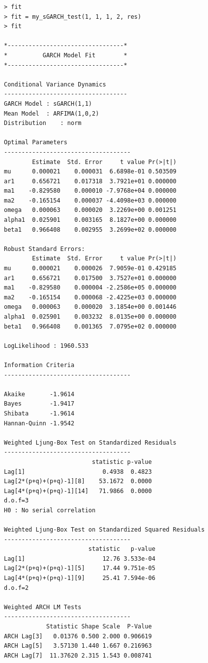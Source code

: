 \documentclass[a4paper, 11pt]{article}
\begin{document}
\begin{verbatim}
> fit
> fit = my_sGARCH_test(1, 1, 1, 2, res)
> fit

*---------------------------------*
*          GARCH Model Fit        *
*---------------------------------*

Conditional Variance Dynamics 	
-----------------------------------
GARCH Model	: sGARCH(1,1)
Mean Model	: ARFIMA(1,0,2)
Distribution	: norm 

Optimal Parameters
------------------------------------
        Estimate  Std. Error     t value Pr(>|t|)
mu      0.000021    0.000031  6.6898e-01 0.503509
ar1     0.656721    0.017318  3.7921e+01 0.000000
ma1    -0.829580    0.000010 -7.9768e+04 0.000000
ma2    -0.165154    0.000037 -4.4098e+03 0.000000
omega   0.000063    0.000020  3.2269e+00 0.001251
alpha1  0.025901    0.003165  8.1827e+00 0.000000
beta1   0.966408    0.002955  3.2699e+02 0.000000

Robust Standard Errors:
        Estimate  Std. Error     t value Pr(>|t|)
mu      0.000021    0.000026  7.9059e-01 0.429185
ar1     0.656721    0.017500  3.7527e+01 0.000000
ma1    -0.829580    0.000004 -2.2586e+05 0.000000
ma2    -0.165154    0.000068 -2.4225e+03 0.000000
omega   0.000063    0.000020  3.1854e+00 0.001446
alpha1  0.025901    0.003232  8.0135e+00 0.000000
beta1   0.966408    0.001365  7.0795e+02 0.000000

LogLikelihood : 1960.533 

Information Criteria
------------------------------------
                    
Akaike       -1.9614
Bayes        -1.9417
Shibata      -1.9614
Hannan-Quinn -1.9542

Weighted Ljung-Box Test on Standardized Residuals
------------------------------------
                         statistic p-value
Lag[1]                      0.4938  0.4823
Lag[2*(p+q)+(p+q)-1][8]    53.1672  0.0000
Lag[4*(p+q)+(p+q)-1][14]   71.9866  0.0000
d.o.f=3
H0 : No serial correlation

Weighted Ljung-Box Test on Standardized Squared Residuals
------------------------------------
                        statistic   p-value
Lag[1]                      12.76 3.533e-04
Lag[2*(p+q)+(p+q)-1][5]     17.44 9.751e-05
Lag[4*(p+q)+(p+q)-1][9]     25.41 7.594e-06
d.o.f=2

Weighted ARCH LM Tests
------------------------------------
            Statistic Shape Scale  P-Value
ARCH Lag[3]   0.01376 0.500 2.000 0.906619
ARCH Lag[5]   3.57130 1.440 1.667 0.216963
ARCH Lag[7]  11.37620 2.315 1.543 0.008741


\end{verbatim}
\end{document}
